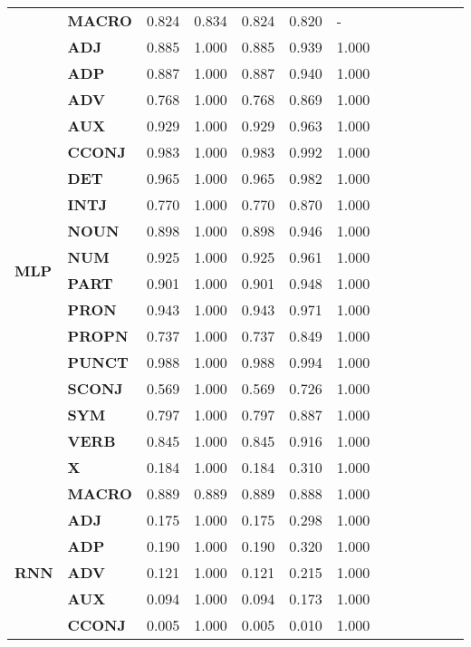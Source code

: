\begin{longtable}{|l||l||l||l||l||l||l||l||l||l||l||l||l|}
\textbf{} & \textbf{MACRO} & 0.824 & 0.834 & 0.824 & 0.820 & - \\
\cline{1-7}
\multirow[t]{18}{*}{\textbf{MLP}} & \textbf{ADJ} & 0.885 & 1.000 & 0.885 & 0.939 & 1.000 \\
\textbf{} & \textbf{ADP} & 0.887 & 1.000 & 0.887 & 0.940 & 1.000 \\
\textbf{} & \textbf{ADV} & 0.768 & 1.000 & 0.768 & 0.869 & 1.000 \\
\textbf{} & \textbf{AUX} & 0.929 & 1.000 & 0.929 & 0.963 & 1.000 \\
\textbf{} & \textbf{CCONJ} & 0.983 & 1.000 & 0.983 & 0.992 & 1.000 \\
\textbf{} & \textbf{DET} & 0.965 & 1.000 & 0.965 & 0.982 & 1.000 \\
\textbf{} & \textbf{INTJ} & 0.770 & 1.000 & 0.770 & 0.870 & 1.000 \\
\textbf{} & \textbf{NOUN} & 0.898 & 1.000 & 0.898 & 0.946 & 1.000 \\
\textbf{} & \textbf{NUM} & 0.925 & 1.000 & 0.925 & 0.961 & 1.000 \\
\textbf{} & \textbf{PART} & 0.901 & 1.000 & 0.901 & 0.948 & 1.000 \\
\textbf{} & \textbf{PRON} & 0.943 & 1.000 & 0.943 & 0.971 & 1.000 \\
\textbf{} & \textbf{PROPN} & 0.737 & 1.000 & 0.737 & 0.849 & 1.000 \\
\textbf{} & \textbf{PUNCT} & 0.988 & 1.000 & 0.988 & 0.994 & 1.000 \\
\textbf{} & \textbf{SCONJ} & 0.569 & 1.000 & 0.569 & 0.726 & 1.000 \\
\textbf{} & \textbf{SYM} & 0.797 & 1.000 & 0.797 & 0.887 & 1.000 \\
\textbf{} & \textbf{VERB} & 0.845 & 1.000 & 0.845 & 0.916 & 1.000 \\
\textbf{} & \textbf{X} & 0.184 & 1.000 & 0.184 & 0.310 & 1.000 \\
\textbf{} & \textbf{MACRO} & 0.889 & 0.889 & 0.889 & 0.888 & 1.000 \\
\cline{1-7}
\multirow[t]{18}{*}{\textbf{RNN}} & \textbf{ADJ} & 0.175 & 1.000 & 0.175 & 0.298 & 1.000 \\
\textbf{} & \textbf{ADP} & 0.190 & 1.000 & 0.190 & 0.320 & 1.000 \\
\textbf{} & \textbf{ADV} & 0.121 & 1.000 & 0.121 & 0.215 & 1.000 \\
\textbf{} & \textbf{AUX} & 0.094 & 1.000 & 0.094 & 0.173 & 1.000 \\
\textbf{} & \textbf{CCONJ} & 0.005 & 1.000 & 0.005 & 0.010 & 1.000 \\

\end{longtable}
